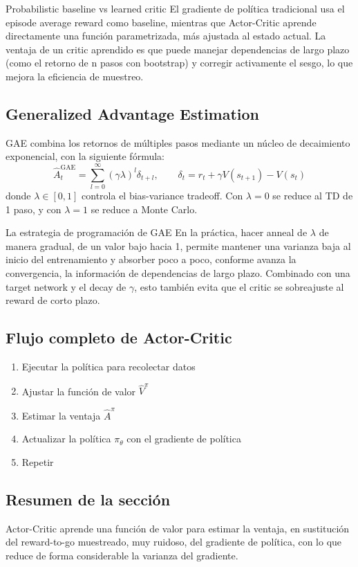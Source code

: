 \begin{knowledgebox}{Probabilistic baseline vs learned critic}
El gradiente de política tradicional usa el episode average reward como baseline, mientras que Actor-Critic aprende directamente una función parametrizada, más ajustada al estado actual. La ventaja de un critic aprendido es que puede manejar dependencias de largo plazo (como el retorno de n pasos con bootstrap) y corregir activamente el sesgo, lo que mejora la eficiencia de muestreo.
\end{knowledgebox}

\subsection{Generalized Advantage Estimation}

GAE combina los retornos de múltiples pasos mediante un núcleo de decaimiento exponencial, con la siguiente fórmula:
$$\hat{A}^\text{GAE}_{t} = \sum_{l=0}^{\infty} (\gamma \lambda)^l \delta_{t+l}, \qquad \delta_t = r_t + \gamma V(s_{t+1}) - V(s_t)$$
donde $\lambda \in [0,1]$ controla el bias-variance tradeoff. Con $\lambda=0$ se reduce al TD de 1 paso, y con $\lambda=1$ se reduce a Monte Carlo.

\begin{importantbox}{La estrategia de programación de GAE}
En la práctica, hacer anneal de $\lambda$ de manera gradual, de un valor bajo hacia 1, permite mantener una varianza baja al inicio del entrenamiento y absorber poco a poco, conforme avanza la convergencia, la información de dependencias de largo plazo. Combinado con una target network y el decay de $\gamma$, esto también evita que el critic se sobreajuste al reward de corto plazo.
\end{importantbox}

\subsection{Flujo completo de Actor-Critic}

\begin{enumerate}
    \item Ejecutar la política para recolectar datos
    \item Ajustar la función de valor $\hat{V}^\pi$
    \item Estimar la ventaja $\hat{A}^\pi$
    \item Actualizar la política $\pi_\theta$ con el gradiente de política
    \item Repetir
\end{enumerate}

\subsection{Resumen de la sección}

Actor-Critic aprende una función de valor para estimar la ventaja, en sustitución del reward-to-go muestreado, muy ruidoso, del gradiente de política, con lo que reduce de forma considerable la varianza del gradiente.

